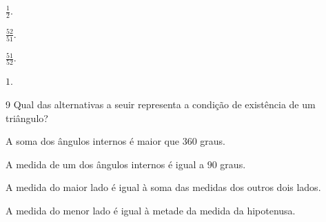 \begin{multicols}{2}
\begin{escolha}
\item $\frac{1}{2}$.
\item $\frac{52}{51}$.
\item $\frac{51}{52}$.
\item $1$.
\end{escolha}
\end{multicols}



\num{9}  Qual das alternativas a seuir representa a condição de existência de
um triângulo?

\begin{escolha}
\item A soma dos ângulos internos é maior que $360$ graus. 
\item A medida de um
dos ângulos internos é igual a $90$ graus. 
\item A medida do maior lado é
igual à soma das medidas dos outros dois lados. 
\item A medida do menor
lado é igual à metade da medida da hipotenusa.
\end{escolha}


